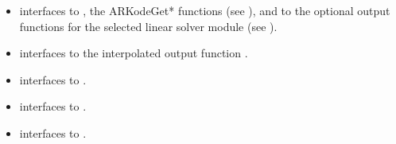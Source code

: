 \documentclass[letterpaper,10pt,english]{sphinxmanual}
\begin{document}
\begin{itemize}
\item {} 
{\hyperref[f_interface/Usage:f/_/FARKODE]{\emph{}}} interfaces to {\hyperref[c_interface/User_callable:c.ARKode]{\emph{}}}, the
ARKodeGet* functions (see {\hyperref[c_interface/User_callable:cinterface-optionaloutputs]{\emph{}}}),
and to the optional output functions for the selected linear
solver module (see {\hyperref[c_interface/User_callable:cinterface-optionaloutputs]{\emph{}}}).

\item {} 
{\hyperref[f_interface/Usage:f/_/FARKDKY]{\emph{}}} interfaces to the interpolated output function
{\hyperref[c_interface/User_callable:c.ARKodeGetDky]{\emph{}}}.

\item {} 
{\hyperref[f_interface/Optional_output:f/_/FARKGETERRWEIGHTS]{\emph{}}} interfaces to
{\hyperref[c_interface/User_callable:c.ARKodeGetErrWeights]{\emph{}}}.

\item {} 
{\hyperref[f_interface/Optional_output:f/_/FARKGETESTLOCALERR]{\emph{}}} interfaces to
{\hyperref[c_interface/User_callable:c.ARKodeGetEstLocalErrors]{\emph{}}}.

\item {} 
{\hyperref[f_interface/Usage:f/_/FARKFREE]{\emph{}}} interfaces to {\hyperref[c_interface/User_callable:c.ARKodeFree]{\emph{}}}.

\end{itemize}
\end{document}
